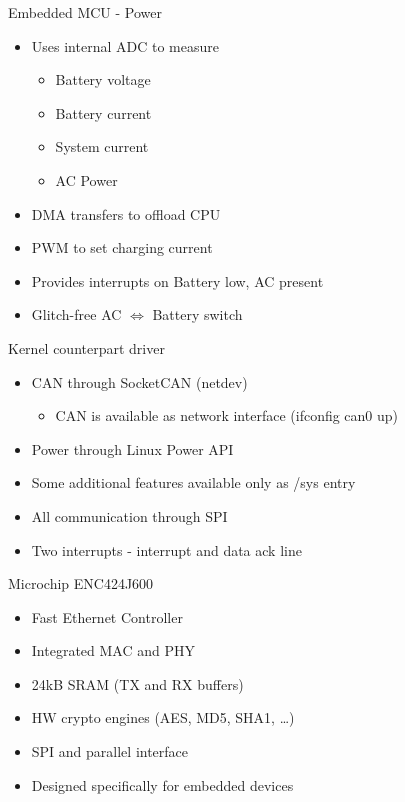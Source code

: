 \documentclass{beamer}
\begin{document}
\begin{frame}{Embedded MCU - Power}
\begin{itemize}
	\item Uses internal ADC to measure
	\begin{itemize}
		\item Battery voltage
		\item Battery current
		\item System current
		\item AC Power
	\end{itemize}
	\item DMA transfers to offload CPU
	\item PWM to set charging current
	\item Provides interrupts on Battery low, AC present
	\item Glitch-free AC \(\Leftrightarrow\) Battery switch
\end{itemize}
\end{frame}

\begin{frame}{Kernel counterpart driver}
\begin{itemize}
	\item CAN through SocketCAN (netdev)
	\begin{itemize}
		\item CAN is available as network interface (ifconfig can0 up)
	\end{itemize}
	\item Power through Linux Power API
	\item Some additional features available only as /sys entry

	\item All communication through SPI
	\item Two interrupts - interrupt and data ack line

\end{itemize}
\end{frame}

\begin{frame}{Microchip ENC424J600}
\begin{itemize}
	\item Fast Ethernet Controller
	\item Integrated MAC and PHY
	\item 24kB SRAM (TX and RX buffers)
	\item HW crypto engines (AES, MD5, SHA1, \ldots)
	\item SPI and parallel interface
	\item Designed specifically for embedded devices
\end{itemize}

\end{frame}
\end{document}
